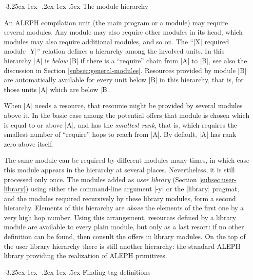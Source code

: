 \documentclass[titlepage]{article}
\makeatletter
\newcommand\A{\textsf{ALEPH}}
\renewcommand\subsection{%
\@startsection{subsection}{2}{\z@}%
   {-3.25ex\@plus -1ex \@minus -.2ex}%
   {1ex \@plus .5ex}%
   {\normalfont\normalsize\bfseries}}
\makeatother
\begin{document}

\subsection{The module hierarchy}\label{subsec:hierarchy}

An \A{} compilation unit (the main program or a module) may require several
modules. Any module may also require other modules in its head, which
modules may also require additional modules, and so on. The ``\pp|X|
required module \pp|Y|'' relation defines a hierarchy among the involved
units. In this hierarchy \pp|A| is \emph{below} \pp|B| if there is a
``require'' chain from \pp|A| to \pp|B|, see also the discussion in Section
\ref{subsec:general-modules}. Resources provided by module \pp|B| are
automatically available for every unit below \pp|B| in this hierarchy, that
is, for those units \pp|A| which are below \pp|B|.

When \pp|A| needs a resource, that resource might be provided by several
modules above it. In the basic case among the potential offers that module is chosen
which is equal to or above \pp|A|, and has the \emph{smallest rank}, that
is, which requires the smallest number of ``require'' hops to reach from
\pp|A|. By default, \pp|A| has rank zero above itself.

The same module can be required by different modules many times, in which
case this module appears in the hierarchy at several places. Nevertheless,
it is still processed only once. The modules added as \emph{user library}
(Section \ref{subsec:user-library}) using either the command-line argument
\pp|-y| or the \pp|library| pragmat, and the modules required recursively by
these library modules, form a second hierarchy. Elements of this hierarchy
are \emph{above} the elements of the first one by a very high hop number.
Using this arrangement, resources defined by a library module are available
to every plain module, but only as a last resort: if no other definition can
be found, then consult the offers in library modules. On the top of the user
library hierarchy there is still another hierarchy: the standard \A{}
library providing the realization of \A{} primitives.


\subsection{Finding tag definitions}\label{subsec:qualifier}
\end{document}
